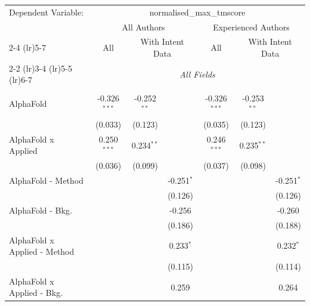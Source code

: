 \begingroup
\centering
\begin{tabular}{lcccccc}
   \tabularnewline \midrule \midrule
   Dependent Variable: & \multicolumn{6}{c}{normalised\_max\_tmscore}\\
 & \multicolumn{3}{c}{All Authors} & \multicolumn{3}{c}{Experienced Authors} \\
\cmidrule(lr){2-4} \cmidrule(lr){5-7}
 & \multicolumn{1}{c}{All} & \multicolumn{2}{c}{With Intent Data} & \multicolumn{1}{c}{All} & \multicolumn{2}{c}{With Intent Data} \\
\cmidrule(lr){2-2} \cmidrule(lr){3-4} \cmidrule(lr){5-5} \cmidrule(lr){6-7}
 & \multicolumn{6}{c}{\textit{All Fields}} \\ \\
   AlphaFold                      & -0.326$^{***}$ & -0.252$^{**}$  &                & -0.326$^{***}$ & -0.253$^{**}$  &   \\   
                                  & (0.033)        & (0.123)        &                & (0.035)        & (0.123)        &   \\   
   AlphaFold x Applied            & 0.250$^{***}$  & 0.234$^{**}$   &                & 0.246$^{***}$  & 0.235$^{**}$   &   \\   
                                  & (0.036)        & (0.099)        &                & (0.037)        & (0.098)        &   \\   
   AlphaFold - Method             &                &                & -0.251$^{*}$   &                &                & -0.251$^{*}$\\   
                                  &                &                & (0.126)        &                &                & (0.126)\\   
   AlphaFold - Bkg.               &                &                & -0.256         &                &                & -0.260\\   
                                  &                &                & (0.186)        &                &                & (0.188)\\   
   AlphaFold x Applied - Method   &                &                & 0.233$^{*}$    &                &                & 0.232$^{*}$\\   
                                  &                &                & (0.115)        &                &                & (0.114)\\   
   AlphaFold x Applied - Bkg.     &                &                & 0.259          &                &                & 0.264\\   

\end{tabular}

